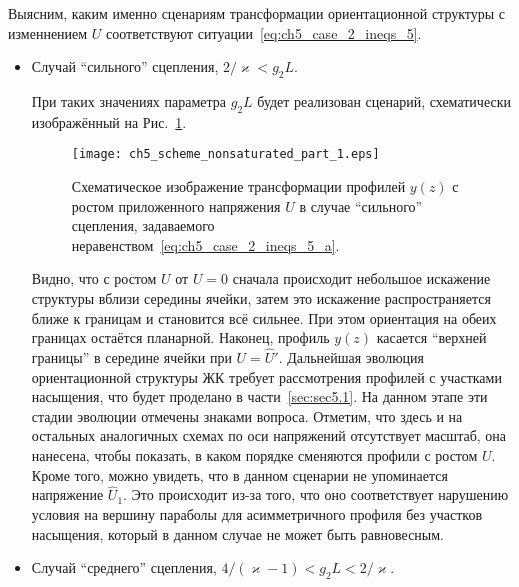 Выясним, каким именно сценариям трансформации ориентационной структуры с изменнением $U$ соответствуют ситуации~\eqref{eq:ch5_case_2_ineqs_5}.
\begin{itemize}
	\item Случай ``сильного'' сцепления, $2/\varkappa < g_2 L$.
	
	При таких значениях параметра $g_2 L$ будет реализован сценарий, схематически изображённый на Рис.~\ref{fig:ch5_scheme_nonsaturated_part_1}.
	\begin{figure}[h]
		\centering
		\texttt{[image: ch5\_scheme\_nonsaturated\_part\_1.eps]}
		\caption{Схематическое изображение трансформации профилей $y(z)$ с ростом приложенного напряжения $U$ в случае ``сильного'' сцепления, задаваемого неравенством~\eqref{eq:ch5_case_2_ineqs_5_a}.}\label{fig:ch5_scheme_nonsaturated_part_1}
	\end{figure}
	Видно, что с ростом $U$ от $U = 0$ сначала происходит небольшое искажение структуры вблизи середины ячейки, затем это искажение распространяется ближе к границам и становится всё сильнее.
	При этом ориентация на обеих границах остаётся планарной.
	Наконец, профиль $y(z)$ касается ``верхней границы'' в середине ячейки при $U = \hat{U}'$.
	Дальнейшая эволюция ориентационной структуры ЖК требует рассмотрения профилей с участками насыщения, что будет проделано в части~\ref{sec:sec5.1}.
	На данном этапе эти стадии эволюции отмечены знаками вопроса.
	Отметим, что здесь и на остальных аналогичных схемах по оси напряжений отсутствует масштаб, она нанесена, чтобы показать, в каком порядке сменяются профили с ростом $U$.
	Кроме того, можно увидеть, что в данном сценарии не упоминается напряжение $\hat{U}_1$.
	Это происходит из-за того, что оно соответствует нарушению условия на вершину параболы для асимметричного профиля без участков насыщения, который в данном случае не может быть равновесным.
	
	\item Случай ``среднего'' сцепления, $4/(\varkappa - 1) < g_2 L < 2/\varkappa$.
	

\end{itemize}

